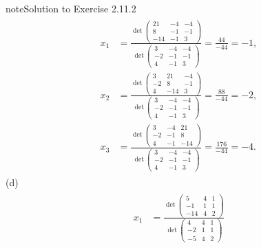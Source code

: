 \documentclass[letterpaper,10pt,english]{jupyterBook}
\begin{document}
\begin{sphinxadmonition}{note}{Solution to Exercise 2.11.2}
\begin{equation*}
\begin{split} \begin{align*} 
    x_{1} &= \frac{\det\left(\begin{matrix}21 & -4 & -4\\8 & -1 & -1\\-14 & -1 & 3\end{matrix}\right)}{\det\left(\begin{matrix}3 & -4 & -4\\-2 & -1 & -1\\4 & -1 & 3\end{matrix}\right)} 
    = \frac{44}{-44} = -1, \\ 
    x_{2} &= \frac{\det\left(\begin{matrix}3 & 21 & -4\\-2 & 8 & -1\\4 & -14 & 3\end{matrix}\right)}{\det\left(\begin{matrix}3 & -4 & -4\\-2 & -1 & -1\\4 & -1 & 3\end{matrix}\right)} 
    = \frac{88}{-44} = -2, \\ 
    x_{3} &= \frac{\det\left(\begin{matrix}3 & -4 & 21\\-2 & -1 & 8\\4 & -1 & -14\end{matrix}\right)}{\det\left(\begin{matrix}3 & -4 & -4\\-2 & -1 & -1\\4 & -1 & 3\end{matrix}\right)} 
    = \frac{176}{-44} = -4. 
\end{align*} \end{split}
\end{equation*}
\sphinxAtStartPar
(d)
\begin{equation*}
\begin{split} \begin{align*} 
    x_{1} &= \frac{\det\left(\begin{matrix}5 & 4 & 1\\-1 & 1 & 1\\-14 & 4 & 2\end{matrix}\right)}{\det\left(\begin{matrix}4 & 4 & 1\\-2 & 1 & 1\\-5 & 4 & 2\end{matrix}\right)} 

\end{align*}
\end{split}
\end{equation*}
\end{sphinxadmonition}
\end{document}
